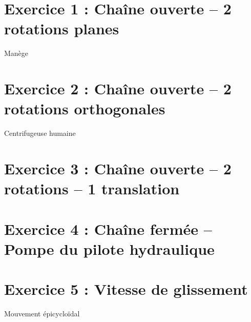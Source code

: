 \documentclass[10pt]{article}
\newif\ifxp
\begin{document}
\ifxp

\else

\fi


\setlength{\parskip}{0ex plus 0.2ex minus 0ex}
 \renewcommand{\contentsname}{}
 \renewcommand{\baselinestretch}{1}

\tableofcontents

 \renewcommand{\baselinestretch}{1.2}
\setlength{\parskip}{2ex plus 0.5ex minus 0.2ex}



\section*{Exercice 1 : Chaîne ouverte -- 2 rotations planes}
Manège

\section*{Exercice 2 : Chaîne ouverte -- 2 rotations orthogonales}
Centrifugeuse humaine

\section*{Exercice 3 : Chaîne ouverte -- 2 rotations -- 1 translation}


\section*{Exercice 4 : Chaîne fermée -- Pompe du pilote hydraulique}

\section*{Exercice 5 : Vitesse de glissement}
Mouvement épicycloïdal
\end{document}
